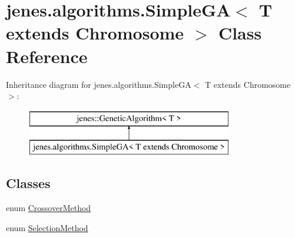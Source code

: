 \hypertarget{classjenes_1_1algorithms_1_1_simple_g_a_3_01_t_01extends_01_chromosome_01_4}{\section{jenes.\-algorithms.\-Simple\-G\-A$<$ T extends Chromosome $>$ Class Reference}
\label{classjenes_1_1algorithms_1_1_simple_g_a_3_01_t_01extends_01_chromosome_01_4}
}
Inheritance diagram for jenes.\-algorithms.\-Simple\-G\-A$<$ T extends Chromosome $>$\-:\begin{figure}[H]
\begin{center}
\leavevmode
\includegraphics[height=2.000000cm]{classjenes_1_1algorithms_1_1_simple_g_a_3_01_t_01extends_01_chromosome_01_4}
\end{center}
\end{figure}
\subsection*{Classes}
\begin{DoxyCompactItemize}
\item 
enum \hyperlink{enumjenes_1_1algorithms_1_1_simple_g_a_3_01_t_01extends_01_chromosome_01_4_1_1_crossover_method}{Crossover\-Method}
\item 
enum \hyperlink{enumjenes_1_1algorithms_1_1_simple_g_a_3_01_t_01extends_01_chromosome_01_4_1_1_selection_method}{Selection\-Method}
\end{DoxyCompactItemize}
